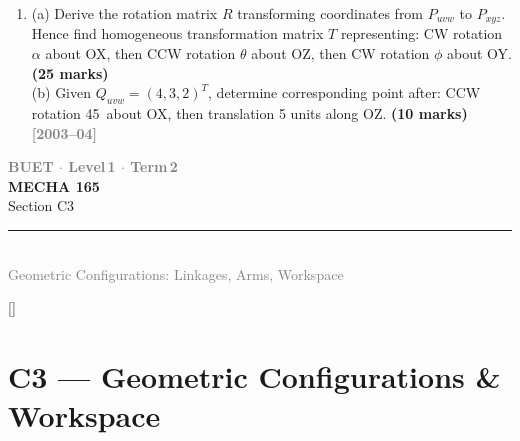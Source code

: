 \documentclass[12pt,a3paper]{article}
\newcommand{\yr}[1]{\hfill\textcolor{gray}{\small\textbf{[#1]}}}
\newcommand{\mk}[1]{\textcolor{orange!70!black}{\small\textbf{(#1 marks)}}}
\newcommand{\secdivider}[4]{%
  \newpage\thispagestyle{empty}%
  \vspace*{\fill}%
  \begin{tcolorbox}[enhanced,colback=#4!7,colframe=#3,boxrule=1.5pt,arc=8pt,
    left=20pt,right=20pt,top=22pt,bottom=22pt,
    shadow={3pt}{-3pt}{0pt}{black!15}]
    \centering
    {\large\textcolor{gray}{\textbf{BUET $\cdot$ Level\,1 $\cdot$ Term\,2}}}\\[8pt]
    {\fontsize{26}{32}\selectfont\bfseries\textcolor{#3}{MECHA 165}}\\[6pt]
    {\fontsize{15}{19}\selectfont\textcolor{dgray}{#1}}\\[12pt]
    \textcolor{#3!60}{\rule{0.5\textwidth}{0.5pt}}\\[6pt]
    {\small\textcolor{gray}{#2}}
  \end{tcolorbox}%
  \vspace*{\fill}\newpage%
}
\begin{document}
\begin{enumerate}
\item \label{qlabel:C2-Q9}
(a) Derive the rotation matrix $R$ transforming coordinates from
$P_{uvw}$ to $P_{xyz}$. Hence find homogeneous transformation matrix $T$
representing: CW rotation $\alpha$ about OX, then CCW rotation $\theta$
about OZ, then CW rotation $\phi$ about OY. \mk{25}\\
(b) Given $Q_{uvw} = (4,3,2)^T$, determine corresponding point after:
CCW rotation 45\textdegree\ about OX, then translation 5 units along
OZ. \mk{10}
\yr{2003--04}





\end{enumerate}
\secdivider{Section C3}{Geometric Configurations: Linkages, Arms, Workspace}{cC}{cC}
\label{sec:C3}
\titleformat{\section}{\large\bfseries\color{cC}}{}{0em}{}[\titlerule]
\section{C3 --- Geometric Configurations \& Workspace}
\end{document}
